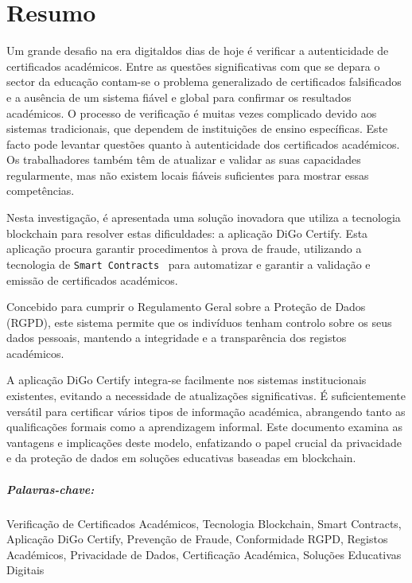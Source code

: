 %
%
\chapter*{Resumo}\label{chap:resumo}

Um grande desafio na era digitaldos dias de hoje é verificar a autenticidade de certificados académicos. Entre as questões significativas com que se depara o sector da educação contam-se o problema generalizado de certificados falsificados e a ausência de um sistema fiável e global para confirmar os resultados académicos. O processo de verificação é muitas vezes complicado devido aos sistemas tradicionais, que dependem de instituições de ensino específicas. Este facto pode levantar questões quanto à autenticidade dos certificados académicos. Os trabalhadores também têm de atualizar e validar as suas capacidades regularmente, mas não existem locais fiáveis suficientes para mostrar essas competências.

Nesta investigação, é apresentada uma solução inovadora que utiliza a tecnologia blockchain para resolver estas dificuldades: a aplicação DiGo Certify. Esta aplicação procura garantir procedimentos à prova de fraude, utilizando a tecnologia de \texttt{Smart Contracts}~\cite{vigliotti2021we} para automatizar e garantir a validação e emissão de certificados académicos.

Concebido para cumprir o Regulamento Geral sobre a Proteção de Dados (RGPD), este sistema permite que os indivíduos tenham controlo sobre os seus dados pessoais, mantendo a integridade e a transparência dos registos académicos.

A aplicação DiGo Certify integra-se facilmente nos sistemas institucionais existentes, evitando a necessidade de atualizações significativas. É suficientemente versátil para certificar vários tipos de informação académica, abrangendo tanto as qualificações formais como a aprendizagem informal. Este documento examina as vantagens e implicações deste modelo, enfatizando o papel crucial da privacidade e da proteção de dados em soluções educativas baseadas em blockchain.

\paragraph{Palavras-chave:} Verificação de Certificados Académicos, Tecnologia Blockchain, Smart Contracts, Aplicação DiGo Certify, Prevenção de Fraude, Conformidade RGPD, Registos Académicos, Privacidade de Dados, Certificação Académica, Soluções Educativas Digitais